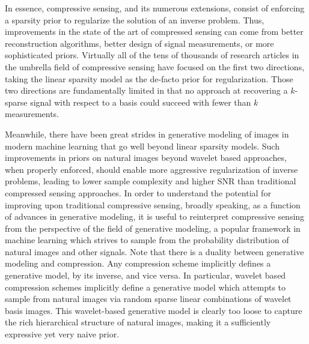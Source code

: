 \documentclass[11pt]{article}
\begin{document}
In essence, compressive sensing, and its numerous extensions, consist of enforcing a sparsity prior to regularize the solution of an inverse problem. Thus, improvements in the state of the art of compressed sensing can come from better reconstruction algorithms, better design of signal measurements, or more sophisticated priors.  Virtually all of the tens of thousands of research articles in the umbrella field of compressive sensing have focused on the first two directions, taking the linear sparsity model as the de-facto prior for regularization.  Those two directions are fundamentally limited in that no approach at recovering a $k$-sparse signal with respect to a basis could succeed with fewer than $k$ measurements.
 
 Meanwhile, there have been great strides in generative modeling of images in modern machine learning that go well beyond linear sparsity models. 
Such improvements in priors on natural images beyond wavelet based approaches, when properly enforced, should enable more aggressive regularization of inverse problems, leading to lower sample complexity and higher SNR than traditional compressed sensing approaches. 
 In order to understand the potential for improving upon traditional compressive sensing, broadly speaking, as a function of advances in generative modeling, it is useful to reinterpret compressive sensing from the perspective of the field of generative modeling, a popular framework in machine learning which strives to sample from the probability distribution of natural images and other signals. Note that there is a duality between generative modeling and compression. Any compression scheme implicitly defines a generative model, by its inverse, and vice versa. In particular, wavelet based compression schemes implicitly define a generative model which attempts to sample from natural images via random sparse linear combinations of wavelet basis images.  This wavelet-based generative model is clearly too loose to capture the rich hierarchical structure of natural images, making it a sufficiently expressive yet very naive prior. 
\end{document}
